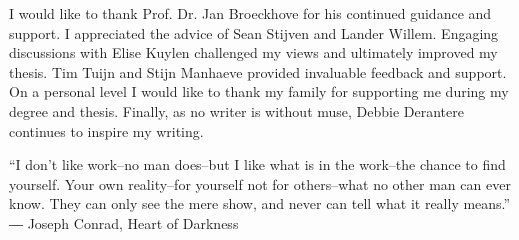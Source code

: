 I would like to thank Prof. Dr. Jan Broeckhove for his continued guidance and support. 
I appreciated the advice of Sean Stijven and Lander Willem.
Engaging discussions with Elise Kuylen challenged my views and ultimately improved my thesis. Tim Tuijn and Stijn Manhaeve provided invaluable feedback and support.
On a personal level I would like to thank my family for supporting me during my degree and thesis. 
Finally, as no writer is without muse, Debbie Derantere continues to inspire my writing. \\

%
\begin{displayquote}
“I don't like work--no man does--but I like what is in the work--the chance to find yourself. Your own reality--for yourself not for others--what no other man can ever know. They can only see the mere show, and never can tell what it really means.” \\
― Joseph Conrad, Heart of Darkness
\end{displayquote}

